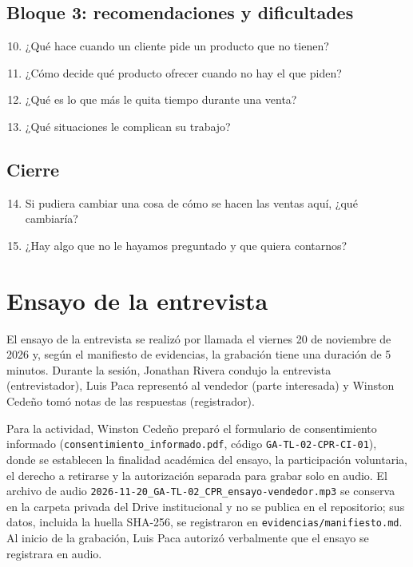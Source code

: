 \documentclass[conference,a4paper]{IEEEtran}
\begin{document}
\subsection{Bloque 3: recomendaciones y dificultades}
\begin{enumerate}\setcounter{enumi}{9}
\item ¿Qué hace cuando un cliente pide un producto que no tienen?
\item ¿Cómo decide qué producto ofrecer cuando no hay el que piden?
\item ¿Qué es lo que más le quita tiempo durante una venta?
\item ¿Qué situaciones le complican su trabajo?
\end{enumerate}

\subsection{Cierre}
\begin{enumerate}\setcounter{enumi}{13}
\item Si pudiera cambiar una cosa de cómo se hacen las ventas aquí, ¿qué cambiaría?
\item ¿Hay algo que no le hayamos preguntado y que quiera contarnos?
\end{enumerate}

\section{Ensayo de la entrevista}
El ensayo de la entrevista se realizó por llamada el viernes 20 de noviembre de
2026 y, según el manifiesto de evidencias, la grabación tiene una duración de
5 minutos. Durante la sesión, Jonathan Rivera condujo la entrevista
(entrevistador), Luis Paca representó al vendedor (parte interesada) y Winston
Cedeño tomó notas de las respuestas (registrador).

Para la actividad, Winston Cedeño preparó el formulario de consentimiento
informado (\texttt{consentimiento\_\allowbreak informado.pdf}, código
\texttt{GA-TL-02-CPR-CI-01}), donde se establecen la finalidad académica del
ensayo, la participación voluntaria, el derecho a retirarse y la autorización
separada para grabar solo en audio. El archivo de audio
\texttt{2026-11-20\_\allowbreak GA-TL-02\_\allowbreak CPR\_\allowbreak ensayo-vendedor.mp3}
se conserva en la carpeta privada del Drive institucional y no se publica en el
repositorio; sus datos, incluida la huella SHA-256, se registraron en
\texttt{evidencias/\allowbreak manifiesto.md}. Al inicio de la grabación, Luis
Paca autorizó verbalmente que el ensayo se registrara en audio.
\end{document}
